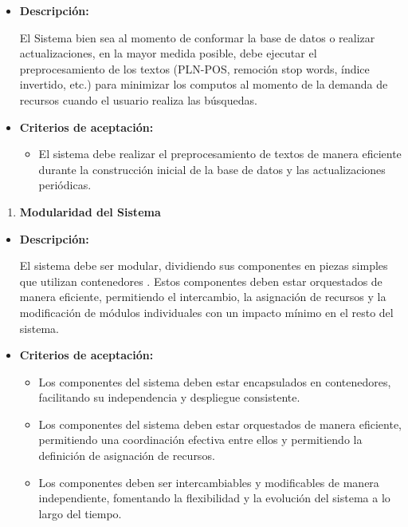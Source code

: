 \documentclass[
  12pt,
  openany]{book}
\providecommand{\tightlist}{%
  \setlength{\itemsep}{0pt}\setlength{\parskip}{0pt}}
\begin{document}
\begin{itemize}
\item
  \textbf{Descripción:}

  El Sistema bien sea al momento de conformar la base de datos o realizar actualizaciones, en la mayor medida posible, debe ejecutar el preprocesamiento de los textos (PLN-POS, remoción stop words, índice invertido, etc.) para minimizar los computos al momento de la demanda de recursos cuando el usuario realiza las búsquedas.
\item
  \textbf{Criterios de aceptación:}

  \begin{itemize}
  \tightlist
  \item
    El sistema debe realizar el preprocesamiento de textos de manera eficiente durante la construcción inicial de la base de datos y las actualizaciones periódicas.
  \end{itemize}
\end{itemize}

\begin{enumerate}
\def\labelenumi{\arabic{enumi}.}
\setcounter{enumi}{4}
\tightlist
\item
  \textbf{Modularidad del Sistema}
\end{enumerate}

\begin{itemize}
\item
  \textbf{Descripción:}

  El sistema debe ser modular, dividiendo sus componentes en piezas simples que utilizan contenedores . Estos componentes deben estar orquestados de manera eficiente, permitiendo el intercambio, la asignación de recursos y la modificación de módulos individuales con un impacto mínimo en el resto del sistema.
\item
  \textbf{Criterios de aceptación:}

  \begin{itemize}
  \item
    Los componentes del sistema deben estar encapsulados en contenedores, facilitando su independencia y despliegue consistente.
  \item
    Los componentes del sistema deben estar orquestados de manera eficiente, permitiendo una coordinación efectiva entre ellos y permitiendo la definición de asignación de recursos.
  \item
    Los componentes deben ser intercambiables y modificables de manera independiente, fomentando la flexibilidad y la evolución del sistema a lo largo del tiempo.
  \end{itemize}
\end{itemize}
\end{document}
